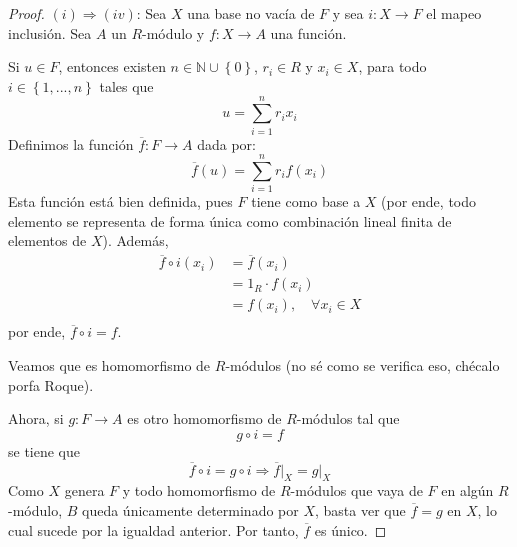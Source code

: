 \documentclass[12pt]{report}
\newcounter{it}
\theoremstyle{largebreak}
\newcommand\cf[3]{\ensuremath{#1:#2\rightarrow#3}}
\begin{document}
    \begin{proof}
        $(i)\Rightarrow(iv)$: Sea $X$ una base no vacía de $F$ y sea $\cf{i}{X}{F}$ el mapeo inclusión. Sea $A$ un $R$-módulo y $\cf{f}{X}{A}$ una función.

        Si $u\in F$, entonces existen $n\in\mathbb{N}\cup\left\{0\right\}$, $r_i\in R$ y $x_i\in X$, para todo $i\in\left\{1,...,n\right\}$ tales que
        \begin{equation*}
            u=\sum_{ i=1}^n r_i x_i
        \end{equation*}
        Definimos la función $\cf{\overline{f}}{F}{A}$ dada por:
        \begin{equation*}
            \overline{f}(u)=\sum_{ i=1}^n r_if(x_i)
        \end{equation*}
        Esta función está bien definida, pues $F$ tiene como base a $X$ (por ende, todo elemento se representa de forma única como combinación lineal finita de elementos de $X$). Además,
        \begin{equation*}
            \begin{split}
                \overline{f}\circ i(x_i)&=\overline{f}(x_i)\\
                &=1_R\cdot f(x_i) \\
                &=f(x_i),\quad\forall x_i\in X \\
            \end{split}
        \end{equation*}
        por ende, $\overline{f}\circ i=f$.

        Veamos que es homomorfismo de $R$-módulos (no sé como se verifica eso, chécalo porfa Roque).

        Ahora, si $\cf{g}{F}{A}$ es otro homomorfismo de $R$-módulos tal que
        \begin{equation*}
            g\circ i=f
        \end{equation*}
        se tiene que
        \begin{equation*}
            \overline{f}\circ i=g\circ i\Rightarrow \overline{f}\big|_{X}=g\big|_{X}
        \end{equation*}
        Como $X$ genera $F$ y todo homomorfismo de $R$-módulos que vaya de $F$ en algún $R$-módulo, $B$ queda únicamente determinado por $X$, basta ver que $\overline{f}=g$ en $X$, lo cual sucede por la igualdad anterior. Por tanto, $\overline{f}$ es único.


\end{proof}
\end{document}
